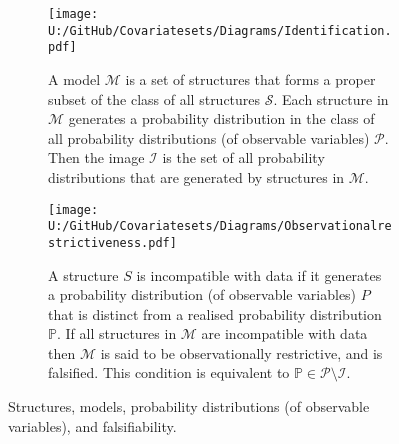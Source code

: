 \documentclass[10pt,a4paper,twoside]{article}
\numberwithin{equation}{section}
\begin{document}
\begin{figure}[p]
\centering
\begin{subfigure}{0.8\textwidth}
  \centering
  \texttt{[image: U:/GitHub/Covariatesets/Diagrams/Identification.pdf]}
  \caption{A model $\mathcal{M}$ is a set of structures that forms a proper subset of the class of all structures $\mathcal{S}$. Each structure in $\mathcal{M}$ generates a probability distribution in the class of all probability distributions (of observable variables) $\mathcal{P}$. Then the image $\mathcal{I}$ is the set of all probability distributions that are generated by structures in $\mathcal{M}$.}
  \label{fig:model}
  \end{subfigure}
\begin{subfigure}{0.8\textwidth}
  \centering
  \texttt{[image: U:/GitHub/Covariatesets/Diagrams/Observationalrestrictiveness.pdf]}
  \caption{A structure $S$ is incompatible with data if it generates a probability distribution (of observable variables) $P$ that is distinct from a realised probability distribution $\mathbb{P}$. If all structures in $\mathcal{M}$ are incompatible with data then $\mathcal{M}$ is said to be observationally restrictive, and is falsified. This condition is equivalent to $\mathbb{P}\in\mathcal{P}\setminus\mathcal{I}$.}
  \label{fig:obs.restrict}
  \end{subfigure}
\caption{Structures, models, probability distributions (of observable variables), and falsifiability.}
\label{fig:models}
\end{figure}
\end{document}
